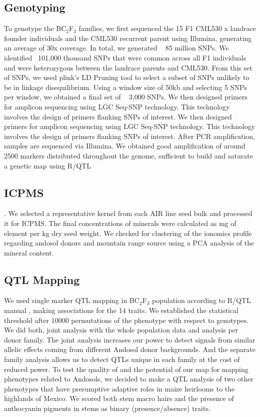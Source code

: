 \subsection{Genotyping}
 To genotype the BC$_2$F$_3$ families, we first sequenced the 15 F1 CML530 x landrace founder individuals and the CML530 recurrent parent using Illumina, generating an average of 30x coverage. In total, we generated ~ 85 million SNPs.
 We identified ~101,000 thousand SNPs that were common across all F1 individuals and were heterozygous between the landrace parents and CML530. From this set of SNPs, we used plink's LD Pruning tool to select a subset of SNPs unlikely to be in linkage disequilibrium. Using a window size of 50kb and selecting 5 SNPs per window,  we obtained a final set of ~ 3,000 SNPs.
 We then designed primers for amplicon sequencing using LGC Seq-SNP technology. This technology involves the design of primers flanking SNPs of interest.
 We then designed primers for amplicon sequencing using LGC Seq-SNP technology.
 This technology involves the design of primers flanking SNPs of interest.
 After PCR amplification, samples are sequenced via Illumina. We obtained good amplification of around 2500 markers distributed throughout the genome, sufficient to build and saturate a genetic map using R/QTL \citep{broman2012}

\subsection{ICPMS}.
We selected a representative kernel from each AIR line seed bulk and processed it for ICPMS.
The final concentrations of minerals were calculated as mg of element per kg dry seed weight. We checked for clustering of the ionomics profile regarding andosol donors and mountain range source using a PCA analysis of the mineral content.

\subsection{QTL Mapping}
We used single marker QTL mapping in BC$_2$F$_3$ population according to R/QTL manual \citep{broman2012},  making associations for the 14 traits.  We established the statistical threshold after 10000 permutations of the phenotype with respect to genotypes.  We did both, joint analysis with the whole population data and analysis per donor family.
The joint analysis increases our power to detect signals from similar allelic effects coming from different Andosol donor backgrounds.
And the separate family analysis allows us to detect QTLs unique in each family at the cost of reduced power. To test the quality of and the potential of  our map for mapping phenotypes related to  Andosols, we decided to make  a QTL analysis of two other phenotypes that have presumptive adaptive roles in maize heirlooms to the highlands of Mexico.
We scored both stem macro hairs and  the presence of anthocyanin pigments in stems as binary (presence/absence) traits. 


